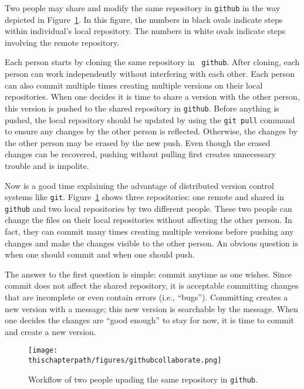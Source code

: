 Two people may share and modify the same repository in {\tt github} in
the way depicted in Figure~\ref{fig:githubcollaborate}.  In this
figure, the numbers in black ovals indicate steps within individual's
local repository.  The numbers in white ovals indicate steps involving
the remote repository.


Each person starts by cloning the same repository in {\tt
  github}. After cloning, each person can work independently without
interfering with each other. Each person can also commit multiple
times creating multiple versions on their local repositories.  When
one decides it is time to share a version with the other person, this
version is pushed to the shared repository in {\tt github}.  Before
anything is pushed, the local repository should be updated by using
the {\tt git pull} command to ensure any changes by the other person
is reflected. Otherwise, the changes by the other person may be erased
by the new push.  Even though the erased changes can be recovered,
pushing without pulling first creates unnecessary trouble and is
impolite.


Now is a good time explaining the advantage of distributed version
control systems like {\tt git}.  Figure~\ref{fig:githubcollaborate}
shows three repositories: one remote and shared in {\tt github} and
two local repositories by two different people. These two people can
change the files on their local repositories without affecting the
other person.  In fact, they can commit many times creating multiple
versions before pushing any changes and make the changes visible to
the other person.  An obvious question is when one should commit
and when one should push.

The answer to the first question is simple: commit anytime as one
wishes.  Since commit does not affect the shared repository, it is
acceptable committing changes that are incomplete or even contain
errors (i.e., ``bugs''). Committing creates a new version with a
message; this new version is searchable by the message.  When one
decides the changes are ``good enough'' to stay for now, it is time to
commit and create a new version.  

\begin{figure}[h] \centering
{\texttt{[image: \\thischapterpath/figures/githubcollaborate.png]}}
\caption{Workflow of two people upading the same repository in {\tt github}.}
\label{fig:githubcollaborate}
\end{figure}

